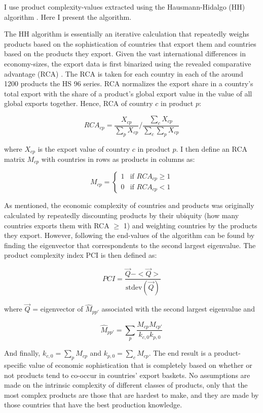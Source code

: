\documentclass[11pt]{article}
\begin{document}
\begin{appendices}
I use product complexity-values extracted using the Hausmann-Hidalgo (HH) algorithm \citep{hidalgo_building_2009}. Here I present the algorithm. 

The HH algorithm is essentially an iterative calculation that repeatedly weighs products based on the sophistication of countries that export them and countries based on the products they export. Given the vast international differences in economy-sizes, the export data is first binarized using the revealed comparative advantage (RCA) \citep{balassa_trade_1965}. The RCA is taken for each country in each of the around 1200 products the HS 96 series. RCA normalizes the export share in a country's total export with the share of a product's global export value in the value of all global exports together. Hence, RCA of country \(c\) in product \(p\):

\[
RCA_{cp} = \frac{X_{cp}}{\sum_p X_{cp}} \bigg/ \frac{\sum_c X_{cp}}{\sum_c \sum_p X_{cp}}
\]

where \(X_{cp}\) is the export value of country \(c\) in product \(p\). I then define an RCA matrix \(M_{cp}\) with countries in rows as products in columns as:

\[
M_{cp} = \begin{cases}
1 & \text{if } RCA_{cp} \geq 1 \\
0 & \text{if } RCA_{cp} < 1
\end{cases}
\]

As mentioned, the economic complexity of countries and products was originally calculated by repeatedly discounting products by their ubiquity (how many countries exports them with RCA $\geq$ 1) and weighting countries by the products they export. However, following \cite{hausmann_atlas_2013} the end-values of the algorithm can be found by finding the eigenvector that correspondents to the second largest eigenvalue. The product complexity index PCI is then defined as:

\[
  PCI = \frac{\vec{Q} - < \vec{Q} >}{\text{stdev}(\vec{Q})}
\]

 where \(\vec{Q}\) = eigenvector of \(\hat{M}_{pp'}\) associated with the second largest eigenvalue and

\[
\hat{M}_{pp'} = \sum_p \frac{M_{cp}M_{cp'}}{k_{c,0}k_{p,0}}
\]

And finally, \(k_{c,0} = \sum_p M_{cp}\) and \(k_{p,0} = \sum_c M_{cp}\). The end result is a product-specific value of economic sophistication that is completely based on whether or not products tend to co-occur in countries' export baskets. No assumptions are made on the intrinsic complexity of different classes of products, only that the most complex products are those that are hardest to make, and they are made by those countries that have the best production knowledge. 


\end{appendices}
\end{document}
